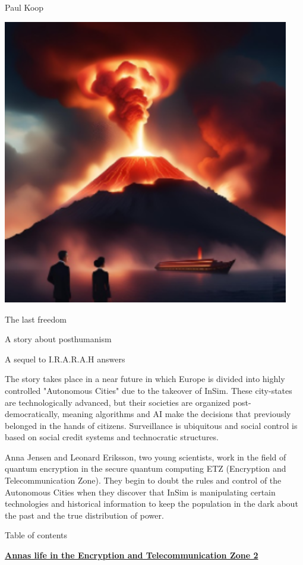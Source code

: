 \documentclass[
]{article}
\author{}
\date{}
\begin{document}
Paul Koop

\includegraphics[width=4.92849in,height=4.92031in]{media/image6.png}

The last freedom

A story about posthumanism

A sequel to I.R.A.R.A.H answers

The story takes place in a near future in which Europe is divided into
highly controlled "Autonomous Cities" due to the takeover of InSim.
These city-states are technologically advanced, but their societies are
organized post-democratically, meaning algorithms and AI make the
decisions that previously belonged in the hands of citizens.
Surveillance is ubiquitous and social control is based on social credit
systems and technocratic structures.

Anna Jensen and Leonard Eriksson, two young scientists, work in the
field of quantum encryption in the secure quantum computing ETZ
(Encryption and Telecommunication Zone). They begin to doubt the rules
and control of the Autonomous Cities when they discover that InSim is
manipulating certain technologies and historical information to keep the
population in the dark about the past and the true distribution of
power.

Table of contents

\hyperref[annas-life-in-the-encryption-and-telecommunication-zone]{\textbf{Anna\textquotesingle s
life in the Encryption and Telecommunication Zone 2}}
\end{document}
